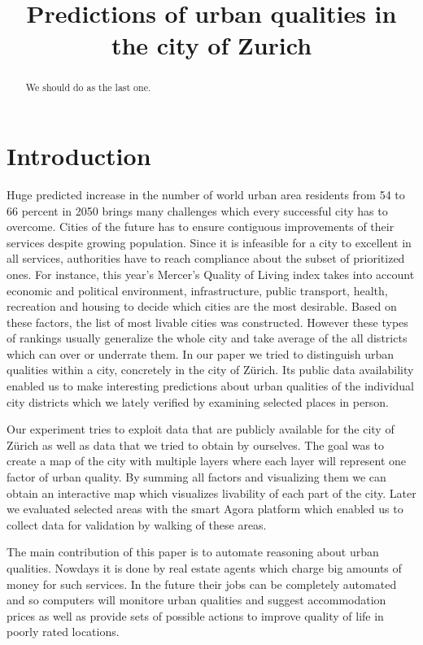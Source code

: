 \documentclass[letterpaper]{article}
\title{Predictions of urban qualities in the city of Zurich}
\begin{document}
%
\maketitle
%

\begin{abstract}
We should do as the last one.
\end{abstract}

\section{Introduction}\label{sec:intro}
Huge predicted increase in the number of world urban area residents from 54 to 66 percent in 2050 brings many challenges 
which every successful city has to overcome. Cities of the future has to ensure contiguous improvements of their 
services despite growing population. Since it is infeasible for a city to excellent in all services, 
authorities have to reach compliance about the subset of prioritized ones. For instance, this year's Mercer's Quality of Living index 
takes into account economic and political environment, infrastructure, public transport, health, recreation and housing 
to decide which cities are the most desirable. Based on these factors, the list of most livable cities was constructed. 
However these types of rankings usually generalize the whole city and take average of the all districts which can 
over or underrate them. In our paper we tried to distinguish urban qualities within a city, concretely in the city of Zürich. 
Its public data availability enabled us to make interesting predictions about urban qualities of the individual city districts 
which we lately verified by examining selected places in person. 

\indent Our experiment tries to exploit data that are publicly available for the city of Zürich as well as data that we tried to obtain by ourselves. 
The goal was to create a map of the city with multiple layers where each layer will represent one factor of urban quality. By summing all factors and 
visualizing them we can obtain an interactive map which visualizes livability of each part of the city. Later we evaluated selected areas with the smart
Agora platform which enabled us to collect data for validation by walking of these areas.

\indent The main contribution of this paper is to automate reasoning about urban qualities. Nowdays it is done by
real estate agents which charge big amounts of money for such services. In the future their jobs can be 
completely automated and so computers will monitore urban qualities and suggest accommodation prices as well as
provide sets of possible actions to improve quality of life in poorly rated locations.
\end{document}
